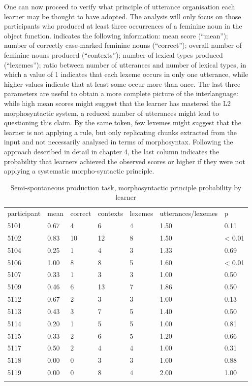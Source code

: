 One can now proceed to verify what principle of utterance organisation each learner may be thought to have adopted. The analysis will only focus on those participants who produced at least three occurrences of a feminine noun in the object function.  indicates the following information: mean score (“mean”); number of correctly case-marked feminine nouns (“correct”); overall number of feminine nouns produced (“contexts”); number of lexical types produced (“lexemes”); ratio between number of utterances and number of lexical types, in which a value of 1 indicates that each lexeme occurs in only one utterance, while higher values indicate that at least some occur more than once. The last three parameters are useful to obtain a more complete picture of the interlanguage: while high mean scores might suggest that the learner has mastered the L2 morphosyntactic system, a reduced number of utterances might lead to questioning this claim. By the same token, few lexemes might suggest that the learner is not applying a rule, but only replicating chunks extracted from the input and not necessarily analysed in terms of morphosyntax. Following the approach described in detail in chapter 4, the last column indicates the probability that learners achieved the observed scores or higher if they were not applying a systematic morpho-syntactic principle. 

\begin{table}
    \begin{tabularx}{\textwidth}{XXXXXXX}
        \lsptoprule
         participant & mean & correct & contexts & lexemes & utterances/lexemes & p\\
         5101 & 0.67 & 4 & 6 & 4 & 1.50 & 0.11\\
         5102 & 0.83 & 10 & 12 & 8 & 1.50 & < 0.01\\
         5104 & 0.25 & 1 & 4 & 3 & 1.33 & 0.69\\
         5106 & 1.00 & 8 & 8 & 5 & 1.60 & < 0.01\\
         5107 & 0.33 & 1 & 3 & 3 & 1.00 & 0.50\\
         5109 & 0.46 & 6 & 13 & 7 & 1.86 & 0.50\\
         5112 & 0.67 & 2 & 3 & 3 & 1.00 & 0.13\\
         5113 & 0.43 & 3 & 7 & 5 & 1.40 & 0.50\\
         5114 & 0.20 & 1 & 5 & 5 & 1.00 & 0.81\\
         5115 & 0.33 & 2 & 6 & 5 & 1.20 & 0.66\\
         5117 & 0.50 & 2 & 4 & 4 & 1.00 & 0.31\\
         5118 & 0.00 & 0 & 3 & 3 & 1.00 & 0.88\\
         5119 & 0.00 & 0 & 8 & 4 & 2.00 & 1.00\\
        \lspbottomrule
    \end{tabularx}
    \caption{Semi-spontaneous production task, morphosyntactic principle probability by learner}
    \label{tab:07:5}
\end{table}

